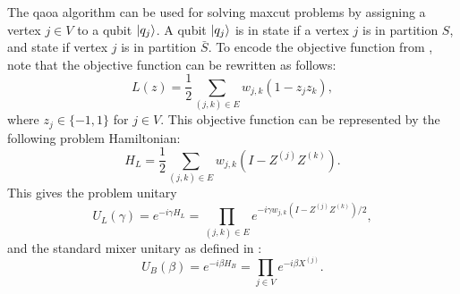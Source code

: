 The \gls{qaoa} algorithm can be used for solving \gls{maxcut} problems by assigning a vertex $j \in V$ to a qubit $\vert{q_j}\rangle$.
A qubit $\vert{q_j}\rangle$ is in state  if a vertex $j$ is in partition $S$, and state  if vertex $j$ is in partition $\bar{S}$.
To encode the objective function from , note that the objective function can be rewritten as follows:
\begin{equation}
L(z) = \frac{1}{2} \sum_{(j, k) \in E} w_{j, k}(1 - z_jz_k),
\end{equation}
where $z_j \in \{-1, 1\}$ for $j \in V$.
This objective function can be represented by the following problem Hamiltonian:
\begin{equation} \label{eqn:problem-hamiltonian}
H_L = \frac{1}{2} \sum_{(j, k) \in E} w_{j, k}\left(I - Z^{(j)}Z^{(k)}\right).
\end{equation}
This gives the problem unitary
\begin{equation} \label{eqn:problem-unitary}
U_L(\gamma) = e^{-i\gamma H_L} = \prod_{(j, k) \in E} e^{-i\gamma w_{j, k}(I - Z^{(j)}Z^{(k)})/2},
\end{equation}
and the standard mixer unitary as defined in :
\begin{equation} \label{eqn:mixer-unitary}
U_B(\beta) = e^{-i\beta H_B} = \prod_{j \in V} e^{-i\beta X^{(j)}}.
\end{equation}


